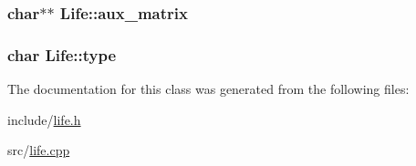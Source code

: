 \subsubsection[{\texorpdfstring{aux\+\_\+matrix}{aux_matrix}}]{\setlength{\rightskip}{0pt plus 5cm}char$\ast$$\ast$ Life\+::aux\+\_\+matrix}\hypertarget{classLife_a207d51f8631df0fbda12a23e2b6b112f}{}\label{classLife_a207d51f8631df0fbda12a23e2b6b112f}
\subsubsection[{\texorpdfstring{type}{type}}]{\setlength{\rightskip}{0pt plus 5cm}char Life\+::type}\hypertarget{classLife_a32121ce5b98c0b7d8b1b0f2a5f1114aa}{}\label{classLife_a32121ce5b98c0b7d8b1b0f2a5f1114aa}


The documentation for this class was generated from the following files\+:\begin{DoxyCompactItemize}
\item 
include/\hyperlink{life_8h}{life.\+h}\item 
src/\hyperlink{life_8cpp}{life.\+cpp}\end{DoxyCompactItemize}
